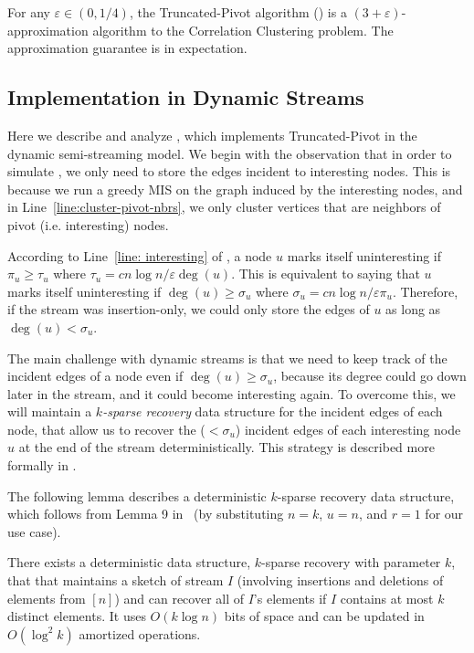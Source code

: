 \documentclass{theoretics}
\newcommand{\truncatedpivot}{\textrm{Truncated-Pivot}\xspace}
\newcommand{\eps}{\ensuremath{\varepsilon}}
\begin{document}
\begin{theorem}\label{cor: parallelApproximation}
    For any $\eps \in (0,1/4)$, the \truncatedpivot algorithm () is a $(3 + \eps)$-approximation algorithm to the Correlation Clustering problem. 
    The approximation guarantee is in expectation. 
\end{theorem}

\subsection{Implementation in Dynamic Streams}

{
Here we describe and analyze , which implements \truncatedpivot in the dynamic semi-streaming model. We begin with the observation that in order to simulate , we only need to store the edges incident to interesting nodes. This is because we run a greedy MIS on the graph induced by the interesting nodes, and in Line~\ref{line:cluster-pivot-nbrs}, we only cluster vertices that are neighbors of pivot (i.e. interesting) nodes.

According to Line~\ref{line: interesting} of , a node $u$ marks itself uninteresting if $\pi_{u} \geq \tau_{u}$ where $\tau_{u} = c n\log n / \eps \deg(u)$. This is equivalent to saying that $u$ marks itself uninteresting if $\deg(u) \geq \sigma_{u}$ where $\sigma_{u} = c n\log n / \eps \pi_u$. Therefore, if the stream was insertion-only, we could only store the edges of $u$ as long as $\deg(u) < \sigma_{u}$.

The main challenge with dynamic streams is that we need to keep track of the incident edges of a node even if $\deg(u) \geq \sigma_{u}$, because its degree could go down later in the stream, and it could become interesting again. To overcome this, we will maintain a \emph{$k$-sparse recovery} data structure for the incident edges of each node, that allow us to recover the ($<\sigma_u$) incident edges of each interesting node $u$ at the end of the stream deterministically. This strategy is described more formally in . 

The following lemma describes a deterministic $k$-sparse recovery data structure, which follows from Lemma 9 in~\cite{DBLP:journals/tcs/BarkayPS15} (by substituting $n = k$, $u = n$, and $r = 1$ for our use case).

\begin{lemma}\label{lem: k-sparse-recovery}
    There exists a deterministic data structure, $k$-sparse recovery with parameter $k$, that that maintains a sketch of stream $I$ (involving insertions and deletions of elements from $[n]$) and can recover all of $I$’s elements if $I$ contains at most $k$ distinct elements. It uses $O(k \log n)$ bits of space and can be updated in $O(\log^2 k)$ amortized operations.
\end{lemma}

}
\end{document}
